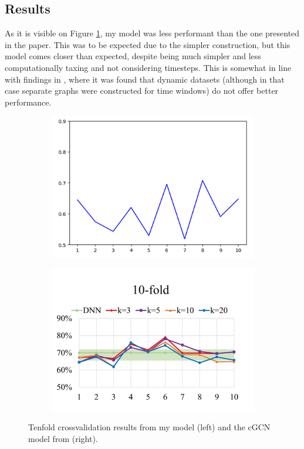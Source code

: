 	\subsection{Results}
	
	As it is visible on Figure \ref{fig:onlab_results}, my model was less performant than the one presented in the paper. This was to be expected due to the simpler construction, but this model comes closer than expected, despite being much simpler and less computationally taxing and not considering timesteps. This is somewhat in line with findings in \cite{said2023neurograph}, where it was found that dynamic datasets (although in that case separate graphs were constructed for time windows) do not offer better performance.
	
	\begin{figure}[!h]
		\centering
		\begin{subfigure}[b]{0.45\textwidth}
			\centering
			\includegraphics[width=\textwidth]{figures/onlab_results.png}
		\end{subfigure}
		\hfill
		\begin{subfigure}[b]{0.45\textwidth}
			\centering
			\includegraphics[width=\textwidth]{figures/paper_results.png}
		\end{subfigure}
		\caption{Tenfold crossvalidation results from my model (left) and the cGCN model from \cite{wang2021graph} (right).}
		\label{fig:onlab_results}
	\end{figure}

